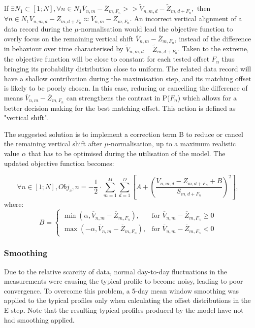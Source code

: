 If $ \exists N_1 \subset [1;N],  \forall n \in N_1 \overline{V}_{n,m} - \overline{Z}_{m,F_n} >> \widetilde{V}_{n,m,d} - \widetilde{Z}_{m,d+F_n},$ then $ \forall n \in N_1 V_{n,m,d} - Z_{m,d+F_n} \approx \overline{V}_{n,m} - \overline{Z}_{m,F_n}  $. An incorrect vertical alignment of a data record during the $\mu$-normalisation would lead the objective function to overly focus on the remaining vertical shift $\overline{V}_{n,m} - \overline{Z}_{m,F_n}$, instead of the difference in behaviour over time characterised by $\widetilde{V}_{n,m,d} - \widetilde{Z}_{m,d+F_n}$. Taken to the extreme, the objective function will be close to constant for each tested offset $F_n$ thus bringing its probability distribution close to uniform. The related data record will have a shallow contribution during the maximisation step, and its matching offset is likely to be poorly chosen. In this case, reducing or cancelling the difference of means $\overline{V}_{n,m} - \overline{Z}_{m,F_n}$ can strengthens the contrast in P($F_n$) which allows for a better decision making for the best matching offset. This action is defined as "vertical shift".

The suggested solution is to implement a correction term B to reduce or cancel the remaining vertical shift after $\mu$-normalisation, up to a maximum realistic value $\alpha$ that has to be optimised during the utilisation of the model. The updated objective function becomes:

\begin{equation}
    \forall n \in [1;N], Obj_c,n = -\frac{1}{2} \cdot \sum_{m=1}^M \sum_{d=1}^D \left[ A + \left( \frac{V_{n,m,d} - Z_{m,d+F_n} + B }{ S_{m,d+F_n} } \right)^2 \right],
\end{equation} 
where:
\begin{equation}
    B = 
    \begin{cases}
        \min (\alpha, \overline{V}_{n,m} - \overline{Z}_{m,F_n} ), & \text{for } \overline{V}_{n,m} - \overline{Z}_{m,F_n} \geq 0\\
        \max (-\alpha, \overline{V}_{n,m} - \overline{Z}_{m,F_n} ), & \text{for } \overline{V}_{n,m} - \overline{Z}_{m,F_n} < 0
    \end{cases}
\end{equation}

\subsubsection{Smoothing}
Due to the relative scarcity of data, normal day-to-day fluctuations in the measurements were causing the typical profile to become noisy, leading to poor convergence. To overcome this problem, a 5-day mean window smoothing was applied to the typical profiles only when calculating the offset distributions in the E-step. Note that the resulting typical profiles produced by the model have not had smoothing applied.

